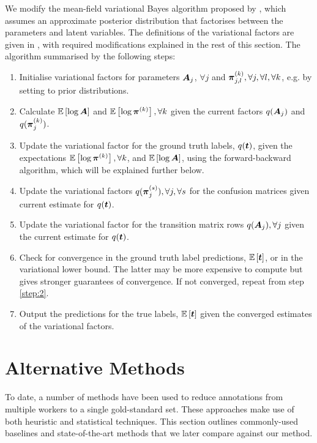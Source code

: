 We modify the mean-field variational Bayes algorithm proposed by \cite{simpsonlong}, 
which assumes an approximate posterior distribution that factorises between the parameters and 
latent variables. The definitions of the variational factors are given in \cite{simpsonlong},
with required modifications explained in the rest of this section. 
The algorithm summarised by the following steps:
\begin{enumerate}
 \item \label{step:1} Initialise variational factors for parameters
$\boldsymbol A_j$, $\forall j$ and
$\boldsymbol\pi_{j,l}^{(k)}, \forall j, \forall l, \forall k$, e.g. by setting to prior distributions.
 \item \label{step:2} Calculate $\mathbb{E}\left[\log \boldsymbol A \right]$ 
and $\mathbb{E}\left[\log\boldsymbol\pi^{(k)} \right], \forall k$ given the current factors 
$q(\boldsymbol A_j)$ and $q(\boldsymbol\pi_j^{(k)})$.
 \item Update the variational factor for the ground truth labels, $q(\boldsymbol t)$, given 
the expectations $\mathbb{E}\left[\log\boldsymbol\pi^{(k)} \right], \forall k$, and
$\mathbb{E}\left[\log \boldsymbol A \right]$, using the forward-backward
algorithm\cite{ghahramani2001introduction}, which will be explained further below.
 \item Update the variational factors $q(\boldsymbol\pi_j^{(s)}), \forall j, \forall s$ for the confusion matrices given current estimate for $q(\boldsymbol t)$.
 \item \label{step:4} Update the variational factor for the transition matrix rows
$q(\boldsymbol A_j), \forall j$ given the current estimate for $q(\boldsymbol t)$.
 \item \label{step:6} Check for convergence in the ground truth label predictions,
$\mathbb{E}\left[\boldsymbol t\right]$, or in the variational lower bound. 
The latter may be more expensive to compute but gives stronger guarantees of convergence. 
If not converged, repeat from step \ref{step:2}.
\item \label{step:7} Output the predictions for the true labels, $\mathbb{E}\left[\boldsymbol t\right]$ given the converged estimates of the variational factors.
\end{enumerate}

\section{Alternative Methods}\label{sec:alt}

To date, a number of methods have been used to reduce annotations from multiple workers to a single gold-standard set. These approaches make use of both heuristic and statistical techniques. This section outlines commonly-used baselines and state-of-the-art methods that we later compare against our method.

